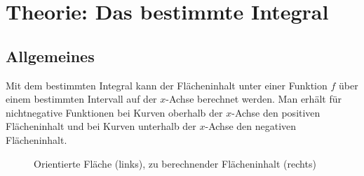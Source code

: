 \documentclass{fhnwreport} %
\begin{document}
\clearpage

\section{Theorie: Das bestimmte Integral}
\subsection{Allgemeines}
Mit dem bestimmten Integral kann der Flächeninhalt unter einer Funktion $f$ über einem bestimmten Intervall auf der $x$-Achse berechnet werden. Man erhält für nichtnegative Funktionen bei Kurven oberhalb der $x$-Achse den positiven Flächeninhalt und bei Kurven unterhalb der $x$-Achse den negativen Flächeninhalt. 
\begin{figure}[!h]
\caption{Orientierte Fläche (links), zu berechnender Flächeninhalt (rechts)}
\end{figure}
\end{document}
